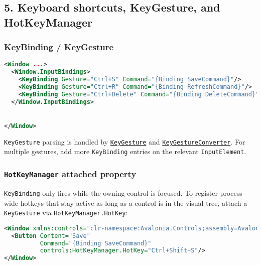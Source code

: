 \subsection{5. Keyboard shortcuts, KeyGesture, and
HotKeyManager}\label{keyboard-shortcuts-keygesture-and-hotkeymanager}

\subsubsection{KeyBinding / KeyGesture}\label{keybinding-keygesture}

\begin{lstlisting}[language=XML]
<Window ...>
  <Window.InputBindings>
    <KeyBinding Gesture="Ctrl+S" Command="{Binding SaveCommand}"/>
    <KeyBinding Gesture="Ctrl+R" Command="{Binding RefreshCommand}"/>
    <KeyBinding Gesture="Ctrl+Delete" Command="{Binding DeleteCommand}" CommandParameter="{Binding SelectedName}"/>
  </Window.InputBindings>


</Window>
\end{lstlisting}

\passthrough{\lstinline!KeyGesture!} parsing is handled by
\href{https://github.com/AvaloniaUI/Avalonia/blob/master/src/Avalonia.Base/Input/KeyGesture.cs}{\passthrough{\lstinline!KeyGesture!}}
and
\href{https://github.com/AvaloniaUI/Avalonia/blob/master/src/Avalonia.Base/Input/KeyGestureConverter.cs}{\passthrough{\lstinline!KeyGestureConverter!}}.
For multiple gestures, add more \passthrough{\lstinline!KeyBinding!}
entries on the relevant \passthrough{\lstinline!InputElement!}.

\subsubsection{\texorpdfstring{\texttt{HotKeyManager} attached
property}{HotKeyManager attached property}}\label{hotkeymanager-attached-property}

\passthrough{\lstinline!KeyBinding!} only fires while the owning control
is focused. To register process-wide hotkeys that stay active as long as
a control is in the visual tree, attach a
\passthrough{\lstinline!KeyGesture!} via
\passthrough{\lstinline!HotKeyManager.HotKey!}:

\begin{lstlisting}[language=XML]
<Window xmlns:controls="clr-namespace:Avalonia.Controls;assembly=Avalonia.Controls">
  <Button Content="Save"
          Command="{Binding SaveCommand}"
          controls:HotKeyManager.HotKey="Ctrl+Shift+S"/>
</Window>
\end{lstlisting}

